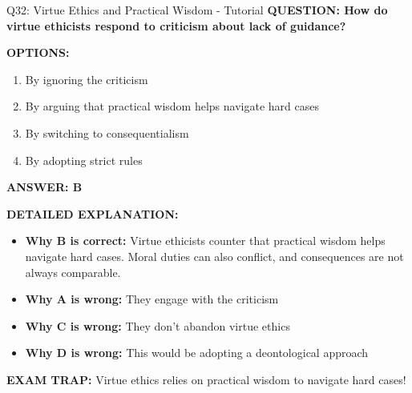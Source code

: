 \documentclass[8pt]{beamer}
\begin{document}
	\begin{frame}{Q32: Virtue Ethics and Practical Wisdom - Tutorial}
		\fontsize{6.5}{7.5}\selectfont
		\textbf{QUESTION: How do virtue ethicists respond to criticism about lack of guidance?}
		
		\vspace{0.1cm}
		\textbf{OPTIONS:}
		\begin{enumerate}
			\item By ignoring the criticism
			\item By arguing that practical wisdom helps navigate hard cases
			\item By switching to consequentialism
			\item By adopting strict rules
		\end{enumerate}
		
		\vspace{0.1cm}
		\textcolor{myblue}{\textbf{ANSWER: B}}
		
		\vspace{0.1cm}
		\textbf{DETAILED EXPLANATION:}
		\begin{itemize}
			\item \textbf{Why B is correct:} Virtue ethicists counter that practical wisdom helps navigate hard cases. Moral duties can also conflict, and consequences are not always comparable.
			\item \textbf{Why A is wrong:} They engage with the criticism
			\item \textbf{Why C is wrong:} They don't abandon virtue ethics
			\item \textbf{Why D is wrong:} This would be adopting a deontological approach
		\end{itemize}
		
		\textcolor{myred}{\textbf{EXAM TRAP:}} Virtue ethics relies on \textcolor{myblue}{practical wisdom} to navigate hard cases!
	\end{frame}
	
\end{document}

